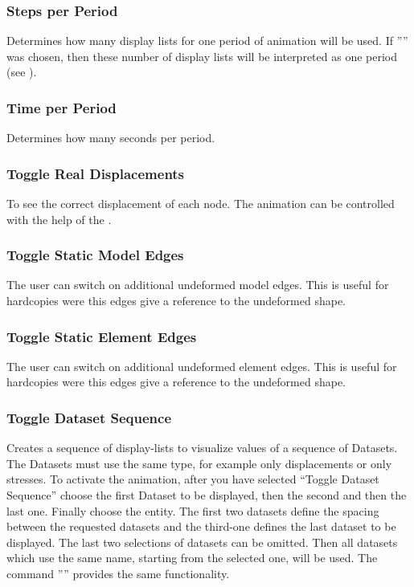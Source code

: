 \documentclass{article}
\begin{document}
\subsubsection{\label{Steps per Period}Steps per Period}
Determines how many display lists for one period of animation will be used. If '''' was chosen, then these number of display lists will be interpreted as one period (see ).

\subsubsection{\label{Time per Period}Time per Period}
Determines how many seconds per period. 

\subsubsection{\label{Toggle Real Displacements}Toggle Real Displacements}
To see the correct displacement of each node. The animation can be controlled with the help of the .

\subsubsection{\label{Toggle Static Model Edges}Toggle Static Model Edges}
The user can switch on additional undeformed model edges. This is useful for hardcopies were this edges give a reference to the undeformed shape.

\subsubsection{\label{Toggle Static Element Edges}Toggle Static Element Edges}
The user can switch on additional undeformed element edges. This is useful for hardcopies were this edges give a reference to the undeformed shape.

\subsubsection{\label{Toggle Dataset Sequence}Toggle Dataset Sequence}
Creates a sequence of display-lists to visualize values of a sequence of Datasets. The Datasets must use the same type, for example only displacements or only stresses. To activate the animation, after you have selected ``Toggle Dataset Sequence'' choose the first Dataset to be displayed, then the second  and then the last one. Finally choose the entity. The first two datasets define the spacing between the requested datasets and the third-one defines the last dataset to be displayed. The last two selections of datasets can be omitted. Then all datasets which use the same name, starting from the selected one, will be used. The command '''' provides the same functionality. 
\end{document}
